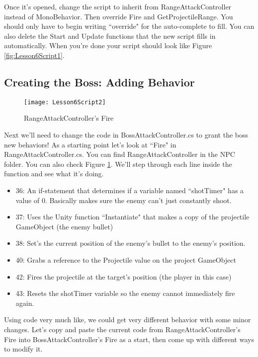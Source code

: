 \documentclass{article}
\begin{document}
Once it's opened, change the script to inherit from RangeAttackController instead of MonoBehavior. Then override Fire and GetProjectileRange. You should only have to begin writing ``override" for the auto-complete to fill. You can also delete the Start and Update functions that the new script fills in automatically. When you're done your script should look like Figure \ref{fig:Lesson6Script1}.

\subsection{Creating the Boss: Adding Behavior}

\begin{figure}
  \texttt{[image: Lesson6Script2]}
  \caption{RangeAttackController's Fire}
  \label{fig:Lesson6Script2}
\end{figure}

Next we'll need to change the code in BossAttackController.cs to grant the boss new behaviors! As a starting point let's look at ``Fire" in RangeAttackController.cs. You can find RangeAttackController in the NPC folder. You can also check Figure \ref{fig:Lesson6Script2}. We'll step through each line inside the function and see what it's doing. 

\begin{itemize}
	\item 36: An if-statement that determines if a variable named ``shotTimer" has a value of 0. Basically makes sure the enemy can't just constantly shoot.
	\item 37: Uses the Unity function ``Instantiate" that makes a copy of the projectile GameObject (the enemy bullet)
	\item 38: Set's the current position of the enemy's bullet to the enemy's position.
	\item 40: Grabs a reference to the Projectile value on the project GameObject
	\item 42: Fires the projectile at the target's position (the player in this case)
	\item 43: Resets the shotTimer variable so the enemy cannot immediately fire again.
\end{itemize}

Using code very much like, we could get very different behavior with some minor changes. Let's copy and paste the current code from RangeAttackController's Fire into BossAttackController's Fire as a start, then come up with different ways to modify it. 
\end{document}
